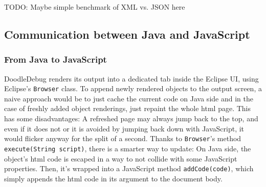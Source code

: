 \documentclass[a4paper,ngerman,english]{amsbook} %
\begin{document}
TODO: Maybe simple benchmark of XML vs. JSON here 

\subsection*{Communication between Java and JavaScript}
\subsubsection*{From Java to JavaScript}
DoodleDebug renders its output into a dedicated tab inside the Eclipse UI, using Eclipse's \verb.Browser. class. To append newly rendered objects to the output screen, a naive approach would be to just cache the current code on Java side and in the case of freshly added object renderings, just repaint the whole html page. This has some disadvantages: A refreshed page may always jump back to the top, and even if it does not or it is avoided by jumping back down with JavaScript, it would flicker anyway for the split of a second. Thanks to \verb.Browser.'s method \verb.execute(String script)., there is a smarter way to update: On Java side, the object's html code is escaped in a way to not collide with some JavaScript properties. Then, it's wrapped into a JavaScript method \verb.addCode(code)., which simply appends the html code in its argument to the document body.
\end{document}
